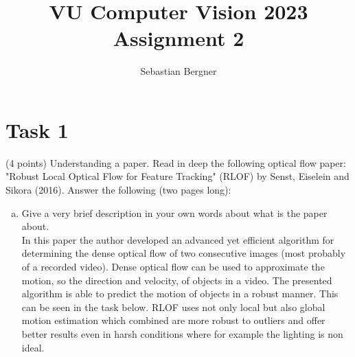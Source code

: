 \documentclass[UTF-8]{article}
\title{VU Computer Vision 2023 \\
	\large Assignment 2}
\author{Sebastian Bergner}
\begin{document}
	
	\maketitle
	
	\section*{Task 1}
	(4 points) Understanding a paper. Read in deep the following optical flow paper: "Robust
	Local Optical Flow for Feature Tracking" (RLOF) by Senst, Eiselein and Sikora (2016).
	Answer the following (two pages long):
	\begin{enumerate}[a.]
		\item Give a very brief description in your own words about what is the paper about.\\
		In this paper the author developed an advanced yet efficient algorithm for determining the dense optical flow of two consecutive images (most probably of a recorded video). Dense optical flow can be used to approximate the motion, so the direction and velocity, of objects in a video. The presented algorithm is able to predict the motion of objects in a robust manner. This can be seen in the task below. RLOF uses not only local but also global motion estimation which combined are more robust to outliers and offer better results even in harsh conditions where for example the lighting is non ideal.
		
		
		
		
		
		
		
		
		

\end{enumerate}
\end{document}
